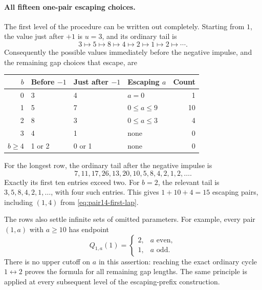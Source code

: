 \paragraph{All fifteen one-pair escaping choices.}
The first level of the procedure can be written out completely.
Starting from $1$, the value just after $+1$ is $u=3$, and its
ordinary tail is
\[
 3\longmapsto5\longmapsto8\longmapsto4\longmapsto2
 \longmapsto1\longmapsto2\longmapsto\cdots.
\]
Consequently the possible values immediately before the negative
impulse, and the remaining gap choices that escape, are
\begin{center}
\begin{tabular}{rlllr}\toprule
$b$ & Before $-1$ & Just after $-1$ & Escaping $a$ & Count\\\midrule
0&3&4&$a=0$&1\\
1&5&7&$0\le a\le9$&10\\
2&8&3&$0\le a\le3$&4\\
3&4&1&none&0\\
$b\ge4$&1 or 2&0 or 1&none&0\\\bottomrule
\end{tabular}
\end{center}
For the longest row, the ordinary tail after the negative impulse is
\[
 7,11,17,26,13,20,10,5,8,4,2,1,2,\ldots.
\]
Exactly its first ten entries exceed two. For $b=2$, the relevant
tail is $3,5,8,4,2,1,\ldots$, with four such entries. This gives
$1+10+4=15$ escaping pairs, including $(1,4)$ from
\eqref{eq:pair14-first-lap}.

The rows also settle infinite sets of omitted parameters. For example,
every pair $(1,a)$ with $a\ge10$ has endpoint
\[
 Q_{1,a}(1)=
 \begin{cases}2,&a\text{ even},\\1,&a\text{ odd}.\end{cases}
\]
There is no upper cutoff on $a$ in this assertion: reaching the exact
ordinary cycle $1\leftrightarrow2$ proves the formula for all remaining
gap lengths. The same principle is applied at every subsequent level
of the escaping-prefix construction.

